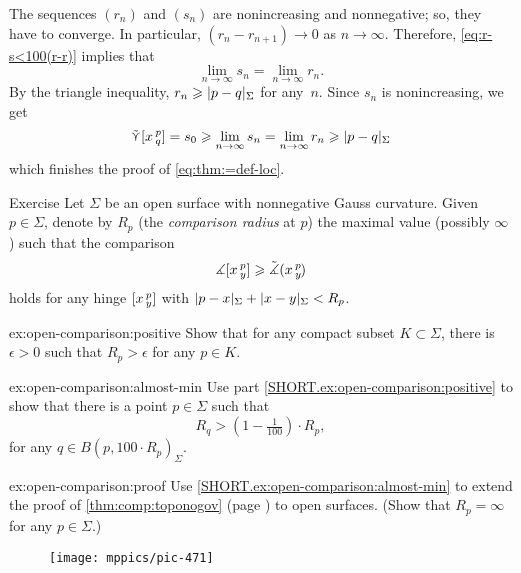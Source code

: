 The sequences $(r_n)$ and $(s_n)$ are nonincreasing and nonnegative;
so, they have to converge.
In particular, $(r_n-r_{n+1})\to0$ as $n\to \infty$.
Therefore, \ref{eq:r-s<100(r-r)} implies that
\[\lim_{n\to\infty}s_n=\lim_{n\to\infty}r_n.\]
By the triangle inequality, $r_n\ge \dist{p}{q}\Sigma$ for any~$n$.
Since $s_n$ is nonincreasing, we get
\[\side \hinge{x}p q=s_0\ge \lim_{n\to\infty}s_n=\lim_{n\to\infty}r_n\ge \dist{p}{q}\Sigma\]
which finishes the proof of \ref{eq:thm:=def-loc}.
\qeds

\begin{thm}{Exercise}\label{ex:open-comparison}
Let $\Sigma$ be an open surface with nonnegative Gauss curvature.
Given $p\in\Sigma$, denote by $R_p$ 
(the {}\emph{comparison radius} at $p$) 
the maximal value (possibly $\infty$) such that the comparison 
\[\measuredangle[x\,{}^{p}_{y}]
\geqslant\tilde\measuredangle(x\,{}^{p}_{y}\hspace{-0.2ex})\]
holds for any hinge $[x\,{}^{p}_{y}]$ with $\dist{p}{x}\Sigma+\dist{x}{y}\Sigma<R_p$.

\begin{subthm}{ex:open-comparison:positive}
Show that for any compact subset $K\subset \Sigma$, there is $\epsilon>0$ such that $R_p>\epsilon$ for any $p\in K$.
\end{subthm}

\begin{subthm}{ex:open-comparison:almost-min}
Use part \ref{SHORT.ex:open-comparison:positive} to show that 
there is a point $p\in\Sigma$ such that 
\[R_q>(1-\tfrac1{100})\cdot R_p,\]
for any $q\in B(p,100\cdot R_p)_\Sigma$.
\end{subthm}

\begin{subthm}{ex:open-comparison:proof}
Use \ref{SHORT.ex:open-comparison:almost-min} to extend the proof of \ref{thm:comp:toponogov} (page \pageref{proof(thm:comp:toponogov)}) to open surfaces. 
(Show that $R_p=\infty$ for any $p\in\Sigma$.) 
\end{subthm}

\end{thm}

\begin{wrapfigure}[4]{r}{30 mm}
\vskip-7mm
\centering
\texttt{[image: mppics/pic-471]}
\end{wrapfigure}

